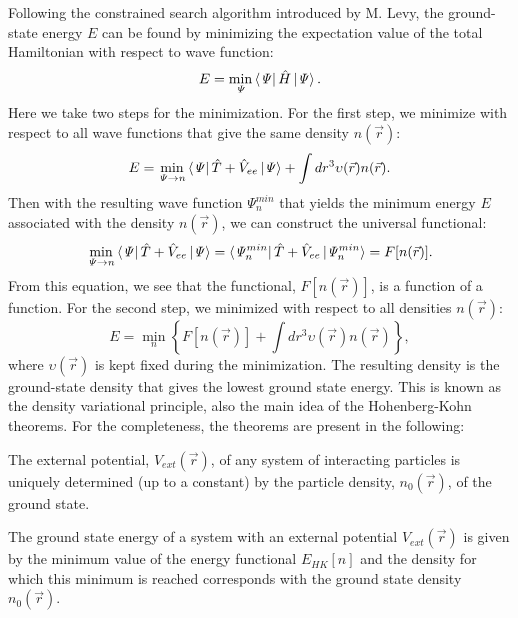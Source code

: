 Following the constrained search algorithm introduced by M. Levy\cite{Levy1979}, the ground-state energy $E$ can be found by minimizing the expectation value of the total Hamiltonian with respect to wave function:
\begin{equation}
E=\min_\mathit{\Psi}\bra{\mathit{\Psi}}\hat{H}\ket{\mathit{\Psi}}.
\end{equation}
Here we take two steps for the minimization. For the first step, we minimize with respect to all wave functions that give the same density $n(\vec{r})$:
\begin{equation}
E=\min_{\mathit{\Psi}\rightarrow n}\bra{\mathit{\Psi}}\hat{T}+\hat{V}_{ee}\ket{\mathit{\Psi}}+\int dr^3\upsilon(\vec{r})n(\vec{r}).
\end{equation}
Then with the resulting wave function $\mathit{\Psi}^{min}_n$ that yields the minimum energy $E$ associated with the density $n(\vec{r})$, we can construct the universal functional:
\begin{equation}
\min_{\mathit{\Psi}\rightarrow n}\bra{\mathit{\Psi}}\hat{T}+\hat{V}_{ee}\ket{\mathit{\Psi}}=\bra{\mathit{\Psi}^{min}_n}\hat{T}+\hat{V}_{ee}\ket{\mathit{\Psi}^{min}_n}=F[n(\vec{r})].
\end{equation}
From this equation, we see that the functional, $F[n(\vec{r})]$, is a function of a function. For the second step, we minimized with respect to all densities $n(\vec{r})$:
\begin{equation}
E=\min_n \left\lbrace F[n(\vec{r})] + \int dr^3\upsilon(\vec{r})n(\vec{r}) \right\rbrace,
\end{equation}
where $\upsilon(\vec{r})$ is kept fixed during the minimization. The resulting density is the ground-state density that gives the lowest ground state energy. This is known as the density variational principle, also the main idea of the Hohenberg-Kohn theorems. For the completeness, the theorems are present in the following:
\begin{theorem}
The external potential, $V_{ext}(\vec{r})$, of any system of interacting particles is uniquely determined (up to a constant) by the particle density, $n_0(\vec{r})$, of the ground state.
\end{theorem}
\begin{theorem}
The ground state energy of a system with an external potential $V_{ext}(\vec{r})$ is given by the minimum value of the energy functional $E_{HK} [n]$ and the density for which this minimum is reached corresponds with the ground state density $n_0(\vec{r})$.
\end{theorem}
